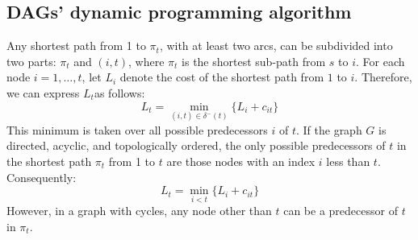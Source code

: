 \documentclass[12pt, a4paper]{report}
\begin{document}
    \subsection{DAGs' dynamic programming algorithm}
    Any shortest path from 1 to $\pi_t$, with at least two arcs, can be subdivided into two parts: $\pi_t$ and $(i,t)$, where $\pi_t$ is the shortest sub-path from $s$ to $i$. 
    For each node  $i=1,\dots,t$, let $L_i$ denote the cost of the shortest path from $1$ to $i$. 
    Therefore, we can express $L_t$as follows:
    \[L_t=\min_{(i,t) \in \delta^{-}(t)}\{L_i+c_{it}\}\]
    This minimum is taken over all possible predecessors $i$ of $t$.
    If the graph $G$ is directed, acyclic, and topologically ordered, the only possible predecessors of $t$ in the shortest path $\pi_t$ from 1 to $t$ are those nodes with an index $i$ less than $t$. 
    Consequently:
    \[L_t=\min_{i<t}\{L_i+c_{it}\}\]
    However, in a graph with cycles, any node other than $t$ can be a predecessor of $t$ in $\pi_t$.  
\end{document}
